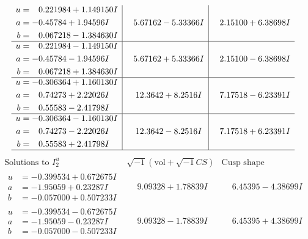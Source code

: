\documentclass[1p]{elsarticle_modified}
\theoremstyle{definition}
\newcommand{\I}{\sqrt{-1}}
\begin{document}
$$\begin{array}{c|c|c}
\begin{aligned}
u &= \phantom{-}0.221984 + 1.149150 I \\
a &= -0.45784 + 1.94596 I \\
b &= \phantom{-}0.067218 - 1.384630 I\end{aligned}
 & \phantom{-}5.67162 - 5.33366 I & \phantom{-}2.15100 + 6.38698 I \\ \hline\begin{aligned}
u &= \phantom{-}0.221984 - 1.149150 I \\
a &= -0.45784 - 1.94596 I \\
b &= \phantom{-}0.067218 + 1.384630 I\end{aligned}
 & \phantom{-}5.67162 + 5.33366 I & \phantom{-}2.15100 - 6.38698 I \\ \hline\begin{aligned}
u &= -0.306364 + 1.160130 I \\
a &= \phantom{-}0.74273 + 2.22026 I \\
b &= \phantom{-}0.55583 - 2.41798 I\end{aligned}
 & \phantom{-}12.3642 + 8.2516 I & \phantom{-}7.17518 - 6.23391 I \\ \hline\begin{aligned}
u &= -0.306364 - 1.160130 I \\
a &= \phantom{-}0.74273 - 2.22026 I \\
b &= \phantom{-}0.55583 + 2.41798 I\end{aligned}
 & \phantom{-}12.3642 - 8.2516 I & \phantom{-}7.17518 + 6.23391 I\\
 \hline 
 \end{array}$$\newpage$$\begin{array}{c|c|c}  
\text{Solutions to }I^u_{2}& \I (\text{vol} + \sqrt{-1}CS) & \text{Cusp shape}\\
 \hline 
\begin{aligned}
u &= -0.399534 + 0.672675 I \\
a &= -1.95059 + 0.23287 I \\
b &= -0.057000 + 0.507233 I\end{aligned}
 & \phantom{-}9.09328 + 1.78839 I & \phantom{-}6.45395 - 4.38699 I \\ \hline\begin{aligned}
u &= -0.399534 - 0.672675 I \\
a &= -1.95059 - 0.23287 I \\
b &= -0.057000 - 0.507233 I\end{aligned}
 & \phantom{-}9.09328 - 1.78839 I & \phantom{-}6.45395 + 4.38699 I \\ \hline\begin{aligned}

\end{aligned}
\end{array}$$
\end{document}
